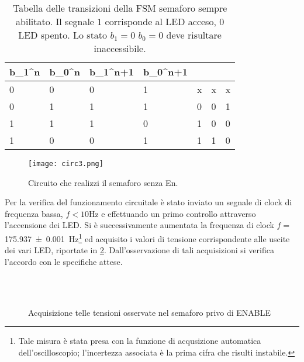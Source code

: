 \begin{table}[h]
\centering
\begin{tabular}{ss|ss|sss}
	\toprule
	b_{1}^{n} & b_{0}^{n}  & b_{1}^{n+1} & b_{0}^{n+1} &  &  &  \\
	 & 0 & 0 & 1  & x  & x & x \\
	 0 & 1 & 1 & 1  & 0 & 0 & 1  \\
	 1 & 1 & 1 & 0  & 1 & 0 & 0 \\
	 1 & 0 & 0 & 1  & 1 & 1 & 0 \\
	\bottomrule
\end{tabular}
\caption{Tabella delle transizioni della FSM semaforo sempre abilitato.
Il segnale $1$ corrisponde al LED acceso, $0$ LED spento.
Lo stato $b_{1}=0$ $b_{0}=0$ deve risultare inaccessibile. }
\label{tab:tran}
\end{table}

\begin{figure}[h!]
		\centering
		\texttt{[image: circ3.png]}
		\caption{Circuito che realizzi il semaforo senza En.}
		\label{fig:sem2}
	\end{figure}

Per la verifica del funzionamento circuitale è stato 
 inviato un segnale di clock di frequenza bassa, $f<10 $\si{\hertz} e effettuando un primo controllo attraverso l'accensione dei LED. Si è successivamente aumentata la frequenza di clock $f= $\SI{175.937\pm 0.001}{\hertz}\footnote{Tale misura è stata presa con la funzione di acqusizione automatica dell'oscilloscopio;  l'incertezza associata è la prima cifra che risulti instabile.}
 ed acquisito i valori di tensione corrispondente alle uscite dei vari LED, riportate in 
 \figurename{ \ref{fig:acq}}. Dall'osservazione di
  tali acquisizioni si verifica l'accordo con le specifiche attese. 
 
\begin{figure}[h]
	\centering
	\\
	\\

\caption{Acquisizione telle tensioni osservate nel semaforo privo di ENABLE}
\label{fig:acq}
\end{figure}
